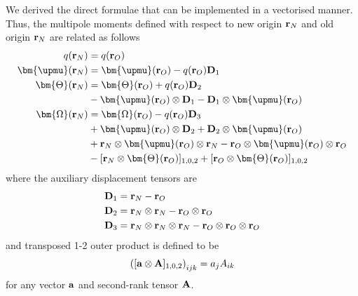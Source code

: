 \documentclass[b5paper,oneside,fleqn,11pt]{book}
\newcommand{\BM}[1]{\bm{#1}}
\begin{document}
\begin{appendices}
\begin{refsection}
We derived the direct formulae that can be implemented in a vectorised manner. 
Thus, the multipole moments
defined with respect to new origin ${\bf r}_N$ and old origin ${\bf r}_N$ are related as follows
%
\begin{subequations}
\begin{align}
q({\bf r}_N)               &= q({\bf r}_O)  \\
{\BM \upmu}({\bf r}_N)       &= {\BM \upmu}({\bf r}_O) - q({\bf r}_O) {\bf D}_1 \\ 
{\BM \Theta}({\bf r}_N)    &= {\BM \Theta}({\bf r}_O) + q({\bf r}_O) {\bf D}_2 \nonumber \\  
 &- {\BM \upmu}({\bf r}_O) \otimes {\bf D}_1 - {\bf D}_1 \otimes {\BM \upmu}({\bf r}_O)  \\  
{\BM \Omega}({\bf r}_N)    &= {\BM \Omega}({\bf r}_O) - q({\bf r}_O) {\bf D}_3 \nonumber \\ 
 &+ {\BM \upmu}({\bf r}_O) \otimes {\bf D}_2 + {\bf D}_2 \otimes {\BM \upmu}({\bf r}_O) \nonumber \\ 
 &+ {\bf r}_N \otimes {\BM \upmu}({\bf r}_O) \otimes {\bf r}_N - {\bf r}_O \otimes {\BM \upmu}({\bf r}_O) \otimes {\bf r}_O \nonumber \\ 
 &- [{\bf r}_N \otimes {\BM \Theta}({\bf r}_O)]_{1,0,2} + [{\bf r}_O \otimes {\BM \Theta}({\bf r}_O)]_{1,0,2} 
\end{align}
\end{subequations}
%
where the auxiliary displacement tensors are
%
\begin{subequations}
\begin{align}
{\bf D}_1 &= {\bf r}_N - {\bf r}_O \\
{\bf D}_2 &= {\bf r}_N \otimes {\bf r}_N  - {\bf r}_O \otimes {\bf r}_O  \\
{\bf D}_3 &= {\bf r}_N \otimes {\bf r}_N \otimes {\bf r}_N  - {\bf r}_O \otimes {\bf r}_O \otimes {\bf r}_O
\end{align}
\end{subequations}
%
and transposed 1-2 outer product is defined to be
%
\begin{equation}
\left( [{\bf a} \otimes {\bf A} ]_{1,0,2} \right)_{ijk} = a_j A_{ik}
\end{equation}
%
for any vector ${\bf a}$ and second-rank tensor ${\bf A}$.

\printbibliography[heading=subbibintoc,title={References}]
\end{refsection}


\end{appendices}
\end{document}
